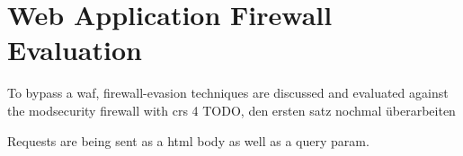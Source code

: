 \section{Web Application Firewall Evaluation}
\label{sec:evaluation}
To bypass a waf, firewall-evasion techniques are discussed and evaluated against the modsecurity firewall with crs 4 {\color{red} TODO, den ersten satz nochmal überarbeiten}

Requests are being sent as a html body as well as a query param.
